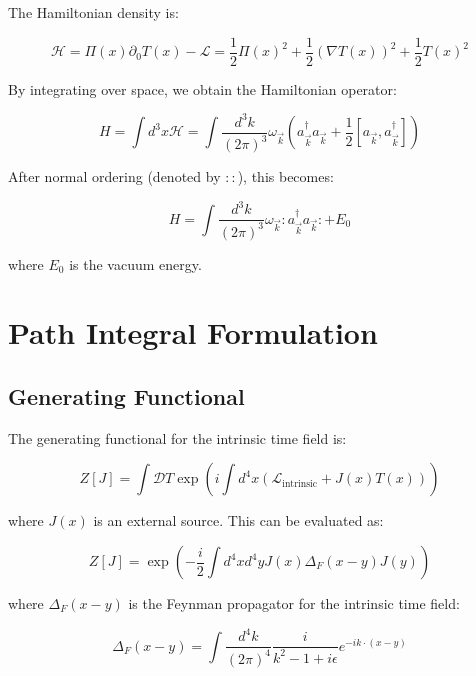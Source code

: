 \documentclass[12pt,a4paper]{article}
\newcommand{\Tfield}{T(x)}
\newcommand{\calL}{\mathcal{L}}
\begin{document}
	The Hamiltonian density is:
	
	\begin{equation}
		\mathcal{H} = \Pi(x)\partial_0 \Tfield - \calL = \frac{1}{2}\Pi(x)^2 + \frac{1}{2}(\nabla \Tfield)^2 + \frac{1}{2}\Tfield^2
	\end{equation}
	
	By integrating over space, we obtain the Hamiltonian operator:
	
	\begin{equation}
		H = \int d^3x \mathcal{H} = \int \frac{d^3k}{(2\pi)^3} \omega_{\vec{k}} \left(a_{\vec{k}}^{\dagger}a_{\vec{k}} + \frac{1}{2}[a_{\vec{k}}, a_{\vec{k}}^{\dagger}]\right)
	\end{equation}
	
	After normal ordering (denoted by $::$), this becomes:
	
	\begin{equation}
		H = \int \frac{d^3k}{(2\pi)^3} \omega_{\vec{k}} :a_{\vec{k}}^{\dagger}a_{\vec{k}}: + E_0
	\end{equation}
	
	where $E_0$ is the vacuum energy.
	
	\section{Path Integral Formulation}
	\label{sec:pfadintegral}
	
	\subsection{Generating Functional}
	\label{sec:erzeugungsfunktional}
	
	The generating functional for the intrinsic time field is:
	
	\begin{equation}
		Z[J] = \int \mathcal{D}T \exp\left(i\int d^4x (\calL_{\text{intrinsic}} + J(x)\Tfield)\right)
	\end{equation}
	
	where $J(x)$ is an external source. This can be evaluated as:
	
	\begin{equation}
		Z[J] = \exp\left(-\frac{i}{2}\int d^4x d^4y J(x)\Delta_F(x-y)J(y)\right)
	\end{equation}
	
	where $\Delta_F(x-y)$ is the Feynman propagator for the intrinsic time field:
	
	\begin{equation}
		\Delta_F(x-y) = \int \frac{d^4k}{(2\pi)^4} \frac{i}{k^2 - 1 + i\epsilon} e^{-ik \cdot (x-y)}
	\end{equation}
	
\end{document}
